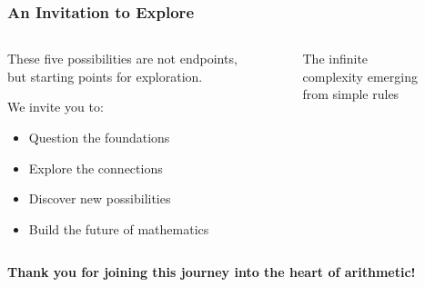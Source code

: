 \documentclass[aspectratio=169]{beamer}
\begin{document}
\begin{frame}
    \frametitle{An Invitation to Explore}
    \begin{columns}
        \begin{column}{0.5\textwidth}
            These five possibilities are not endpoints, but starting points for exploration.
            
            \vspace{0.5cm}
            
            We invite you to:
            \begin{itemize}
                \item Question the foundations
                \item Explore the connections
                \item Discover new possibilities
                \item Build the future of mathematics
            \end{itemize}
        \end{column}
        \begin{column}{0.5\textwidth}
            \begin{figure}[ht]\centering
            \caption{The infinite complexity emerging from simple rules}
            \end{figure}
        \end{column}
    \end{columns}
    
    \vspace{0.5cm}
    
    \begin{center}
        \Large
        \textbf{Thank you for joining this journey into the heart of arithmetic!}
    \end{center}
\end{frame}
\end{document}
